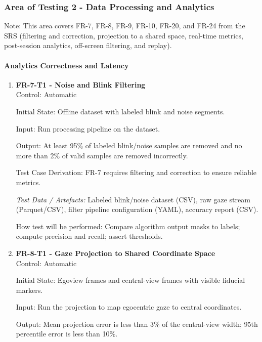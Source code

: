 \documentclass[12pt, titlepage]{article}
\begin{document}
\subsubsection{Area of Testing 2 - Data Processing and Analytics}

Note: This area covers FR-7, FR-8, FR-9, FR-10, FR-20, and FR-24 from the SRS (filtering and correction, projection to a shared space, real-time metrics, post-session analytics, off-screen filtering, and replay).

\paragraph{Analytics Correctness and Latency}

\begin{enumerate}

\item \textbf{FR-7-T1 - Noise and Blink Filtering} \\

Control: Automatic

Initial State: Offline dataset with labeled blink and noise segments.

Input: Run processing pipeline on the dataset.

Output: At least 95\% of labeled blink/noise samples are removed and no more than 2\% of valid samples are removed incorrectly.

Test Case Derivation: FR-7 requires filtering and correction to ensure reliable metrics.

\textit{Test Data / Artefacts:} Labeled blink/noise dataset (CSV), raw gaze stream (Parquet/CSV), filter pipeline configuration (YAML), accuracy report (CSV).

How test will be performed: Compare algorithm output masks to labels; compute precision and recall; assert thresholds.

\item \textbf{FR-8-T1 - Gaze Projection to Shared Coordinate Space} \\

Control: Automatic

Initial State: Egoview frames and central-view frames with visible fiducial markers.

Input: Run the projection to map egocentric gaze to central coordinates.

Output: Mean projection error is less than 3\% of the central-view width; 95th percentile error is less than 10\%.


\end{enumerate}
\end{document}
